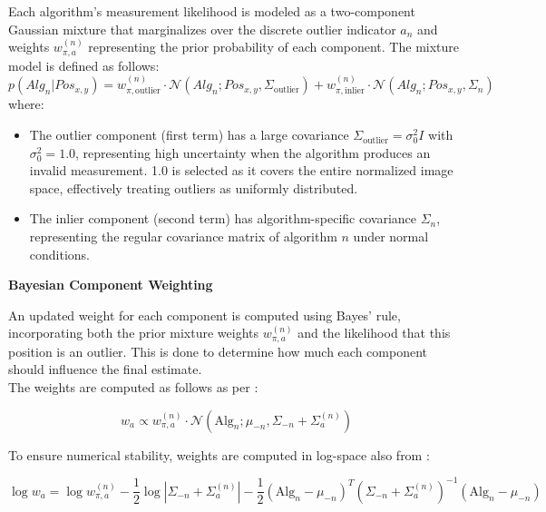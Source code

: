 \documentclass[12pt,a4paper]{article}
\begin{document}
Each algorithm's measurement likelihood is modeled as a two-component Gaussian mixture that marginalizes over the discrete outlier indicator $a_n$ and weights $w_{\pi,a}^{(n)}$ representing the prior probability of each component. The mixture model is defined as follows:
\begin{equation}
p(Alg_n | Pos_{x,y}) = w_{\pi,\text{outlier}}^{(n)} \cdot \mathcal{N}(Alg_n; Pos_{x,y}, \Sigma_{\text{outlier}}) + w_{\pi,\text{inlier}}^{(n)} \cdot \mathcal{N}(Alg_n; Pos_{x,y}, \Sigma_n)
\end{equation}
where:
\begin{itemize}
    \item The outlier component (first term) has a large covariance $\Sigma_{\text{outlier}} = \sigma_0^2 I$ with $\sigma_0^2 = 1.0$, representing high uncertainty when the algorithm produces an invalid measurement. 1.0 is selected as it covers the entire normalized image space, effectively treating outliers as uniformly distributed.
    \item The inlier component (second term) has algorithm-specific covariance $\Sigma_n$, representing the regular covariance matrix of algorithm $n$ under normal conditions.
\end{itemize}

\textbf{Bayesian Component Weighting}

An updated weight for each component is computed using Bayes' rule, incorporating both the prior mixture weights $w_{\pi,a}^{(n)}$ and the likelihood that this position is an outlier. This is done to determine how much each component should influence the final estimate.\\

The weights are computed as follows as per \parencite[pg.~438-439]{bishop2006prml}:

\begin{equation}
w_a \propto w_{\pi,a}^{(n)} \cdot \mathcal{N}(\text{Alg}_n; \mu_{-n}, \Sigma_{-n} + \Sigma_a^{(n)})
\end{equation}

To ensure numerical stability, weights are computed in log-space also from \parencite[pg.~438-439]{bishop2006prml}:

\begin{equation}
\log w_a = \log w_{\pi,a}^{(n)} - \frac{1}{2}\log|\Sigma_{-n} + \Sigma_a^{(n)}| - \frac{1}{2}(\text{Alg}_n - \mu_{-n})^T\left(\Sigma_{-n} + \Sigma_a^{(n)}\right)^{-1}(\text{Alg}_n - \mu_{-n})
\end{equation}
\end{document}

